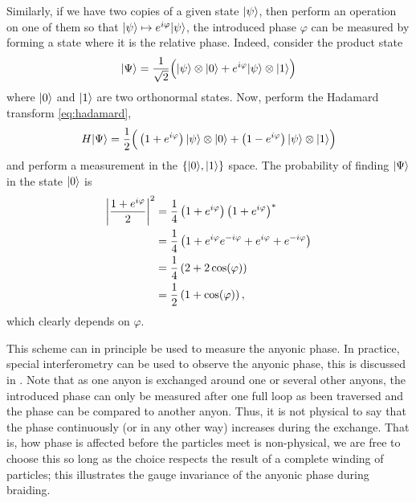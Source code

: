 \documentclass[a4paper,10pt,oneside]{book}
\theoremstyle{plain}
\theoremstyle{definition}
\theoremstyle{remark}
\DeclarePairedDelimiter\abs{\lvert}{\rvert}
\DeclarePairedDelimiter\ket{\lvert}{\rangle}
\begin{document}
Similarly, if we have two copies of a given state $\ket{\psi}$, then perform an operation on one of them so that $\ket{\psi} \mapsto e^{i\varphi}\ket{\psi}$, the introduced phase $\varphi$ can be measured by forming a state where it is the relative phase. Indeed, consider the product state
\begin{equation}
  \ket{\Psi} = \frac{1}{\sqrt{2}} \Big( \ket{\psi}\otimes\ket{0} + e^{i\varphi} \ket{\psi} \otimes\ket{1} \Big)
\end{equation}
where $\ket{0}$ and $\ket{1}$ are two orthonormal states. Now, perform the Hadamard transform \cref{eq:hadamard},
\begin{equation}
  H \ket{\Psi} = \frac{1}{2} \Big( \left(1+e^{i\varphi}\right)\ket{\psi}\otimes\ket{0} + \left(1-e^{i\varphi}\right) \ket{\psi} \otimes\ket{1} \Big)
\end{equation}
and perform a measurement in the $\{\ket{0}, \ket{1}\}$ space. The probability of finding $\ket{\Psi}$ in the state $\ket{0}$ is
\begin{equation}
  \begin{aligned}
    \abs*{\frac{1+e^{i\varphi}}{2}}^2
    &= \frac{1}{4} \left( 1+e^{i\varphi} \right) \left( 1+e^{i\varphi} \right)^* \\
    &= \frac{1}{4} \left( 1 + e^{i\varphi}e^{-i\varphi} + e^{i\varphi} + e^{-i\varphi} \right) \\
    &= \frac{1}{4} \left( 2 + 2\cos(\varphi) \right) \\
    &= \frac{1}{2} \left( 1 + \cos(\varphi) \right),
  \end{aligned}
\end{equation}
which clearly depends on $\varphi$.

This scheme can in principle be used to measure the anyonic phase. In practice, special interferometry can be used to observe the anyonic phase, this is discussed in \cite{bonderson}. Note that as one anyon is exchanged around one or several other anyons, the introduced phase can only be measured after one full loop as been traversed and the phase can be compared to another anyon. Thus, it is not physical to say that the phase continuously (or in any other way) increases during the exchange. That is, how phase is affected before the particles meet is non-physical, we are free to choose this so long as the choice respects the result of a complete winding of particles; this illustrates the gauge invariance of the anyonic phase during braiding.
\end{document}
